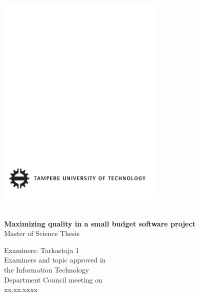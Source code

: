 \documentclass[12pt,a4paper,finnish]{tutthesis}
\begin{document}
 
\thispagestyle{empty}
 
\vspace*{-.5cm}\noindent
 
 
\includegraphics[width=8cm]{tut-logo}
 
\vspace{6.8cm}
 
\\
{\bf\large \textsf{Maximizing quality in a small budget software project}}\\
\textsf{Master of Science Thesis}
 
\vspace{8.7cm} %
 
\begin{flushright}
  
\begin{minipage}[c]{6.8cm}
\begin{spacing}{1.0}
\textsf{Examiners: Tarkastaja 1}\\
\textsf{Examiners and topic approved in}\\ 
\textsf{the Information Technology}\\
\textsf{Department Council meeting on}\\
\textsf{xx.xx.xxxx}\\
\end{spacing}
\end{minipage}
\end{flushright}
 
\end{document}
